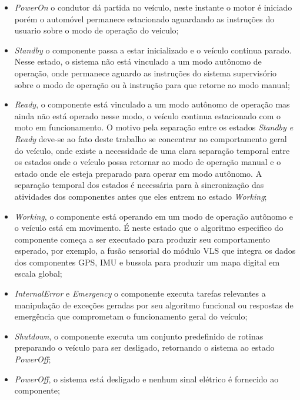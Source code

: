 \documentclass[conference]{IEEEtran}
\begin{document}
\begin{itemize}

	\item \textit{PowerOn} o condutor dá partida no veículo, neste instante o motor é iniciado porém o automóvel permanece estacionado aguardando as instruções do usuario sobre o modo de operação do veiculo;
		
	\item \textit{Standby} o componente passa a estar inicializado e o veículo continua parado. Nesse estado, o sistema não está vinculado a um modo autônomo de operação, onde permanece aguardo as instruções do sistema supervisório sobre o modo de operação ou à instrução para que retorne ao modo manual;
	
	\item \textit{Ready}, o componente está vinculado a um modo autônomo de operação mas ainda não está operado nesse modo, o veículo continua estacionado com o moto em funcionamento. O motivo pela separação entre os estados \textit{Standby e Ready} deve-se ao fato deste trabalho se concentrar no comportamento geral do veículo, onde existe a necessidade de uma clara separação temporal entre os estados onde o veículo possa retornar ao modo de operação manual e o estado onde ele esteja preparado para operar em modo autônomo. A separação temporal dos estados é necessária para à sincronização das atividades dos componentes antes que eles entrem no estado \textit{Working};
	
	\item \textit{Working}, o componente está operando em um modo de operação autônomo e o veículo está em movimento. É neste estado que o algoritmo especifico do componente começa a ser executado para produzir seu comportamento esperado, por exemplo, a fusão sensorial do módulo VLS que integra os dados dos componentes GPS, IMU e bussola para produzir um mapa digital em escala global;
	
	\item \textit{InternalError} e \textit{Emergency} o componente executa tarefas relevantes a manipulação de exceções geradas por seu algoritmo funcional ou respostas de emergência que comprometam o funcionamento geral do veículo;
	
	\item \textit{Shutdown}, o componente executa um conjunto predefinido de rotinas preparando o veículo para ser desligado, retornando o sistema ao estado \textit{PowerOff};
	
	\item \textit{PowerOff}, o sistema está desligado e nenhum sinal elétrico é fornecido ao componente;
\end{itemize}
\end{document}
